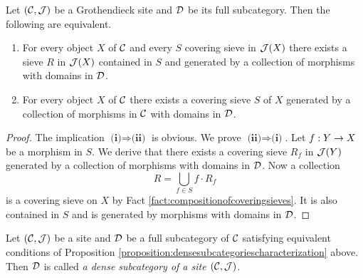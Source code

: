 \begin{proposition}\label{proposition:densesubcategoriescharacterization}
Let $({\mathcal C},{\mathcal J})$ be a Grothendieck site and ${\mathcal D}$ be its full subcategory. Then the following are equivalent.
\begin{enumerate}[label=\emph{\textbf{(\roman*)}}, leftmargin=1.5em]
\item For every object $X$ of ${\mathcal C}$ and every $S$ covering sieve in ${\mathcal J}(X)$ there exists a sieve $R$ in ${\mathcal J}(X)$ contained in $S$ and generated by a collection of morphisms with domains in ${\mathcal D}$.
\item For every object $X$ of ${\mathcal C}$ there exists a covering sieve $S$ of $X$ generated by a collection of morphisms in ${\mathcal C}$ with domains in ${\mathcal D}$.
\end{enumerate}
\end{proposition}
\begin{proof}
The implication $\textbf{(i)}\Rightarrow \textbf{(ii)}$ is obvious. We prove $\textbf{(ii)}\Rightarrow \textbf{(i)}$. Let $f:Y\rightarrow X$ be a morphism in $S$. We derive that there exists a covering sieve $R_f$ in ${\mathcal J}(Y)$ generated by a collection of morphisms with domains in ${\mathcal D}$. Now a collection
$$R = \bigcup_{f\in S}f\cdot R_f$$
is a covering sieve on $X$ by Fact \ref{fact:compositionofcoveringsieves}. It is also contained in $S$ and is generated by morphisms with domains in ${\mathcal D}$.
\end{proof}

\begin{definition}
Let $({\mathcal C}, {\mathcal J})$ be a site and ${\mathcal D}$ be a full subcategory of ${\mathcal C}$ satisfying equivalent conditions of Proposition \ref{proposition:densesubcategoriescharacterization} above. Then ${\mathcal D}$ is called \textit{a dense subcategory of a site $({\mathcal C},{\mathcal J})$}.
\end{definition}

